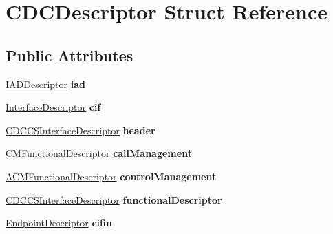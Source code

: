 \hypertarget{struct_c_d_c_descriptor}{}\section{C\+D\+C\+Descriptor Struct Reference}
\label{struct_c_d_c_descriptor}
\subsection*{Public Attributes}
\begin{DoxyCompactItemize}
\item 
\hypertarget{struct_c_d_c_descriptor_a42c277dcdc03a000bb15a468104c996a}{}\hyperlink{struct_i_a_d_descriptor}{I\+A\+D\+Descriptor} {\bfseries iad}\label{struct_c_d_c_descriptor_a42c277dcdc03a000bb15a468104c996a}

\item 
\hypertarget{struct_c_d_c_descriptor_ad3afcf5687ec1055195bd94a1f36d269}{}\hyperlink{struct_interface_descriptor}{Interface\+Descriptor} {\bfseries cif}\label{struct_c_d_c_descriptor_ad3afcf5687ec1055195bd94a1f36d269}

\item 
\hypertarget{struct_c_d_c_descriptor_a3f84b78e1d78e821a539564e57375cf5}{}\hyperlink{struct_c_d_c_c_s_interface_descriptor}{C\+D\+C\+C\+S\+Interface\+Descriptor} {\bfseries header}\label{struct_c_d_c_descriptor_a3f84b78e1d78e821a539564e57375cf5}

\item 
\hypertarget{struct_c_d_c_descriptor_a20b4bdfac02495e248d9cc0c2f10bda8}{}\hyperlink{struct_c_m_functional_descriptor}{C\+M\+Functional\+Descriptor} {\bfseries call\+Management}\label{struct_c_d_c_descriptor_a20b4bdfac02495e248d9cc0c2f10bda8}

\item 
\hypertarget{struct_c_d_c_descriptor_a958194b94ef21f282168a1c15d9527f7}{}\hyperlink{struct_a_c_m_functional_descriptor}{A\+C\+M\+Functional\+Descriptor} {\bfseries control\+Management}\label{struct_c_d_c_descriptor_a958194b94ef21f282168a1c15d9527f7}

\item 
\hypertarget{struct_c_d_c_descriptor_a7ecaf88d51cad3091ba16c3efabd27ad}{}\hyperlink{struct_c_d_c_c_s_interface_descriptor}{C\+D\+C\+C\+S\+Interface\+Descriptor} {\bfseries functional\+Descriptor}\label{struct_c_d_c_descriptor_a7ecaf88d51cad3091ba16c3efabd27ad}

\item 
\hypertarget{struct_c_d_c_descriptor_a7fc244ee56a9337010aff080038b6400}{}\hyperlink{struct_endpoint_descriptor}{Endpoint\+Descriptor} {\bfseries cifin}\label{struct_c_d_c_descriptor_a7fc244ee56a9337010aff080038b6400}


\end{DoxyCompactItemize}
